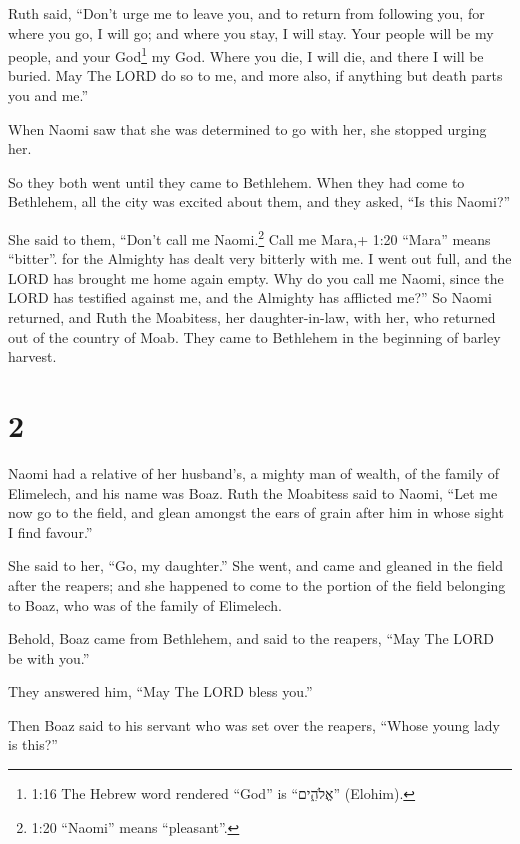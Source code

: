  Ruth said, ``Don't urge me to leave you, and to return
from following you, for where you go, I will go; and where you stay, I
will stay. Your people will be my people, and your God\footnote{1:16 The
  Hebrew word rendered ``God'' is ``אֱלֹהִ֑ים'' (Elohim).} my God.
 Where you die, I will die, and there I will be buried. May
The LORD do so to me, and more also, if anything but death parts you and
me.''

 When Naomi saw that she was determined to go with her, she
stopped urging her.

 So they both went until they came to Bethlehem. When they
had come to Bethlehem, all the city was excited about them, and they
asked, ``Is this Naomi?''

 She said to them, ``Don't call me Naomi.\footnote{1:20
  ``Naomi'' means ``pleasant''.} Call me Mara,+ 1:20 ``Mara'' means
``bitter''. for the Almighty has dealt very bitterly with me.
 I went out full, and the LORD has brought me home again
empty. Why do you call me Naomi, since the LORD has testified against
me, and the Almighty has afflicted me?''  So Naomi
returned, and Ruth the Moabitess, her daughter-in-law, with her, who
returned out of the country of Moab. They came to Bethlehem in the
beginning of barley harvest.

\hypertarget{section-1}{%
\section{2}\label{section-1}}

 Naomi had a relative of her husband's, a mighty man of
wealth, of the family of Elimelech, and his name was Boaz. 
Ruth the Moabitess said to Naomi, ``Let me now go to the field, and
glean amongst the ears of grain after him in whose sight I find
favour.''

She said to her, ``Go, my daughter.''  She went, and came
and gleaned in the field after the reapers; and she happened to come to
the portion of the field belonging to Boaz, who was of the family of
Elimelech.

 Behold, Boaz came from Bethlehem, and said to the reapers,
``May The LORD be with you.''

They answered him, ``May The LORD bless you.''

 Then Boaz said to his servant who was set over the reapers,
``Whose young lady is this?''

